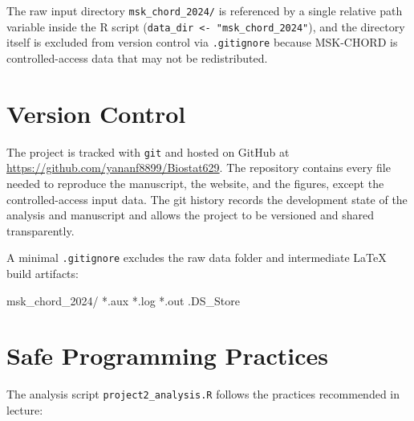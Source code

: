 \documentclass[11pt]{article}
\begin{document}
The raw input directory \texttt{msk\_chord\_2024/} is referenced by a single relative path variable inside the R script (\texttt{data\_dir <- "msk\_chord\_2024"}), and the directory itself is excluded from version control via \texttt{.gitignore} because MSK-CHORD is controlled-access data that may not be redistributed.

\section{Version Control}

The project is tracked with \texttt{git} and hosted on GitHub at \url{https://github.com/yananf8899/Biostat629}. The repository contains every file needed to reproduce the manuscript, the website, and the figures, except the controlled-access input data. The git history records the development state of the analysis and manuscript and allows the project to be versioned and shared transparently.

A minimal \texttt{.gitignore} excludes the raw data folder and intermediate LaTeX build artifacts:

\begin{code}
msk_chord_2024/
*.aux
*.log
*.out
.DS_Store
\end{code}

\section{Safe Programming Practices}

The analysis script \texttt{project2\_analysis.R} follows the practices recommended in lecture:
\end{document}
